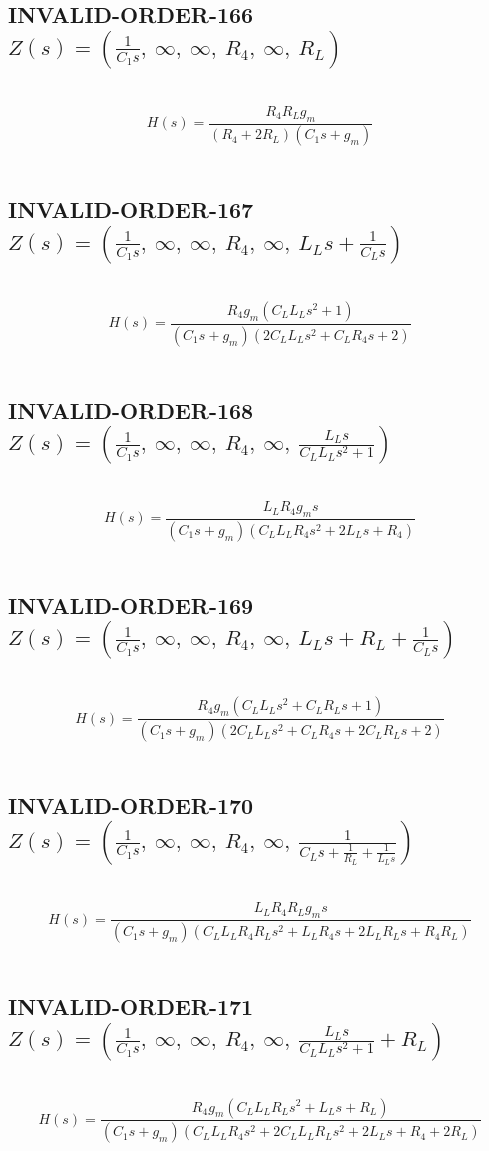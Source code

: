\documentclass{article}
\begin{document}
\subsection{INVALID-ORDER-166 $Z(s) = \left( \frac{1}{C_{1} s}, \  \infty, \  \infty, \  R_{4}, \  \infty, \  R_{L}\right)$ } \ 
\textbf{\[H(s) = \frac{R_{4} R_{L} g_{m}}{\left(R_{4} + 2 R_{L}\right) \left(C_{1} s + g_{m}\right)}\] } \ 
\subsection{INVALID-ORDER-167 $Z(s) = \left( \frac{1}{C_{1} s}, \  \infty, \  \infty, \  R_{4}, \  \infty, \  L_{L} s + \frac{1}{C_{L} s}\right)$ } \ 
\textbf{\[H(s) = \frac{R_{4} g_{m} \left(C_{L} L_{L} s^{2} + 1\right)}{\left(C_{1} s + g_{m}\right) \left(2 C_{L} L_{L} s^{2} + C_{L} R_{4} s + 2\right)}\] } \ 
\subsection{INVALID-ORDER-168 $Z(s) = \left( \frac{1}{C_{1} s}, \  \infty, \  \infty, \  R_{4}, \  \infty, \  \frac{L_{L} s}{C_{L} L_{L} s^{2} + 1}\right)$ } \ 
\textbf{\[H(s) = \frac{L_{L} R_{4} g_{m} s}{\left(C_{1} s + g_{m}\right) \left(C_{L} L_{L} R_{4} s^{2} + 2 L_{L} s + R_{4}\right)}\] } \ 
\subsection{INVALID-ORDER-169 $Z(s) = \left( \frac{1}{C_{1} s}, \  \infty, \  \infty, \  R_{4}, \  \infty, \  L_{L} s + R_{L} + \frac{1}{C_{L} s}\right)$ } \ 
\textbf{\[H(s) = \frac{R_{4} g_{m} \left(C_{L} L_{L} s^{2} + C_{L} R_{L} s + 1\right)}{\left(C_{1} s + g_{m}\right) \left(2 C_{L} L_{L} s^{2} + C_{L} R_{4} s + 2 C_{L} R_{L} s + 2\right)}\] } \ 
\subsection{INVALID-ORDER-170 $Z(s) = \left( \frac{1}{C_{1} s}, \  \infty, \  \infty, \  R_{4}, \  \infty, \  \frac{1}{C_{L} s + \frac{1}{R_{L}} + \frac{1}{L_{L} s}}\right)$ } \ 
\textbf{\[H(s) = \frac{L_{L} R_{4} R_{L} g_{m} s}{\left(C_{1} s + g_{m}\right) \left(C_{L} L_{L} R_{4} R_{L} s^{2} + L_{L} R_{4} s + 2 L_{L} R_{L} s + R_{4} R_{L}\right)}\] } \ 
\subsection{INVALID-ORDER-171 $Z(s) = \left( \frac{1}{C_{1} s}, \  \infty, \  \infty, \  R_{4}, \  \infty, \  \frac{L_{L} s}{C_{L} L_{L} s^{2} + 1} + R_{L}\right)$ } \ 
\textbf{\[H(s) = \frac{R_{4} g_{m} \left(C_{L} L_{L} R_{L} s^{2} + L_{L} s + R_{L}\right)}{\left(C_{1} s + g_{m}\right) \left(C_{L} L_{L} R_{4} s^{2} + 2 C_{L} L_{L} R_{L} s^{2} + 2 L_{L} s + R_{4} + 2 R_{L}\right)}\] } \ 
\end{document}
